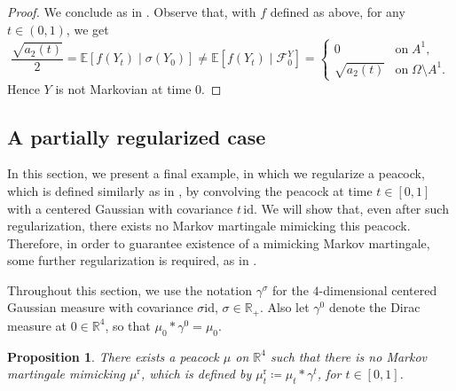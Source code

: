 \documentclass[12pt,oneside]{amsart}
\newtheorem{proposition}[theorem]{Proposition}
\theoremstyle{definition}
\newcommand{\F}{\mathcal F}
\newcommand{\id}{\mathrm{id}}
\newcommand{\R}{\mathbb R}
\newcommand{\reg}{\mathrm{r}}
\def\E{{\mathbb E}}
\def\R{{\mathbb R}}
\numberwithin{equation}{section}
\begin{document}
\begin{proof}
	We conclude as in . Observe that, with $f$ defined as above, for any $t \in (0, 1)$, we get
	\begin{equation}
		\frac{\sqrt{a_2(t)}}{2} = \E[f(Y_t) \mid \sigma(Y_0)] \neq \E[f(Y_t) \mid \F^Y_0] =
		\begin{cases}
			0 & \text{on}\; A^1,\\
			\sqrt{a_2(t)} & \text{on}\; \Omega \setminus A^1.
		\end{cases}
	\end{equation}
	Hence $Y$ is not Markovian at time $0$.
	\end{proof}

\subsection{A partially regularized case}

In this section, we present a final example, in which we regularize a peacock, which is defined similarly as in , by convolving the peacock at time $t \in [0, 1]$ with a centered Gaussian with covariance $t \, \id$. We will show that, even after such regularization, there exists no Markov martingale mimicking this peacock. Therefore, in order to guarantee existence of a mimicking Markov martingale, some further regularization is required, as in .

Throughout this section, we use the notation $\gamma^\sigma$ for the $4$-dimensional centered Gaussian measure with covariance $\sigma \id$, $\sigma \in \R_+$. Also let $\gamma^0$ denote the Dirac measure at $0 \in \R^4$, so that $\mu_0 \ast \gamma^0 = \mu_0$.

\begin{proposition}\label{prop:ex-regularized}
	There exists a peacock $\mu$ on $\R^4$ such that there is no Markov martingale mimicking $\mu^\reg$, which is defined by $\mu^\reg_t \coloneqq \mu_t \ast \gamma^{t}$, for $t \in [0, 1]$.
\end{proposition}
\end{document}
